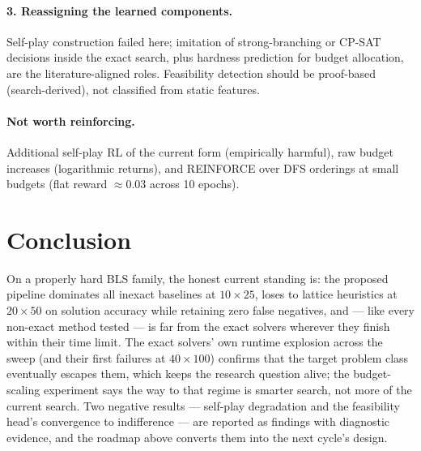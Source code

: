 \documentclass[12pt]{article}
\begin{document}
\paragraph{3. Reassigning the learned components.} Self-play construction failed here; imitation of strong-branching or CP-SAT decisions \citep{gasse2019exact, nair2020solving} inside the exact search, plus hardness prediction for budget allocation, are the literature-aligned roles. Feasibility detection should be proof-based (search-derived), not classified from static features.

\paragraph{Not worth reinforcing.} Additional self-play RL of the current form (empirically harmful), raw budget increases (logarithmic returns), and REINFORCE over DFS orderings at small budgets (flat reward $\approx 0.03$ across 10 epochs).

\section{Conclusion}

On a properly hard BLS family, the honest current standing is: the proposed pipeline dominates all inexact baselines at $10 \times 25$, loses to lattice heuristics at $20 \times 50$ on solution accuracy while retaining zero false negatives, and --- like every non-exact method tested --- is far from the exact solvers wherever they finish within their time limit. The exact solvers' own runtime explosion across the sweep (and their first failures at $40 \times 100$) confirms that the target problem class eventually escapes them, which keeps the research question alive; the budget-scaling experiment says the way to that regime is smarter search, not more of the current search. Two negative results --- self-play degradation and the feasibility head's convergence to indifference --- are reported as findings with diagnostic evidence, and the roadmap above converts them into the next cycle's design.
\end{document}
